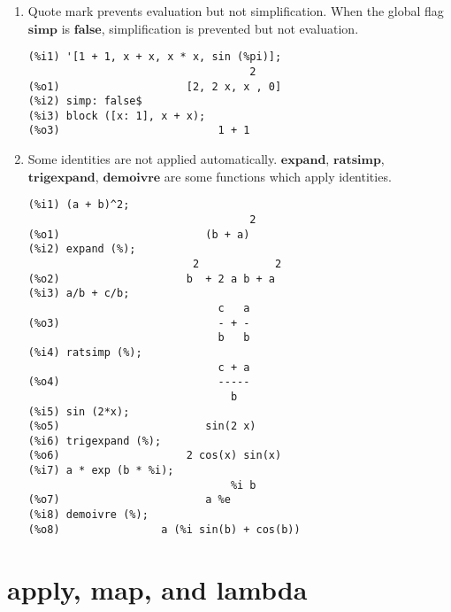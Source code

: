 \documentclass[12pt]{article}
\begin{document}
\begin{enumerate}

\item Quote mark prevents evaluation but not simplification.
When the global flag $\mathbf{simp}$ is $\mathbf{false}$,
simplification is prevented but not evaluation.


\begin{verbatim}
(%i1) '[1 + 1, x + x, x * x, sin (%pi)];
                                   2
(%o1)                    [2, 2 x, x , 0]
(%i2) simp: false$ 
(%i3) block ([x: 1], x + x);
(%o3)                         1 + 1
\end{verbatim}

\item Some identities are not applied automatically.
$\mathbf{expand}$, $\mathbf{ratsimp}$, $\mathbf{trigexpand}$, $\mathbf{demoivre}$
are some functions which apply identities.


\begin{verbatim}
(%i1) (a + b)^2;
                                   2
(%o1)                       (b + a)
(%i2) expand (%);
                          2            2
(%o2)                    b  + 2 a b + a
(%i3) a/b + c/b;
                              c   a
(%o3)                         - + -
                              b   b
(%i4) ratsimp (%);
                              c + a
(%o4)                         -----
                                b
(%i5) sin (2*x);
(%o5)                       sin(2 x)
(%i6) trigexpand (%);
(%o6)                    2 cos(x) sin(x)
(%i7) a * exp (b * %i);
                                %i b
(%o7)                       a %e
(%i8) demoivre (%);
(%o8)                a (%i sin(b) + cos(b))
\end{verbatim}

\end{enumerate}

\section{apply, map, and lambda}
\end{document}
